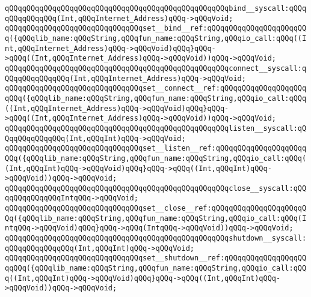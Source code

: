 \newline
\verb|qQQqqQQqqQQqqQQqqQQqqQQqqQQqqQQqqQQqqQQqqQQqqQQqqQQqbind__syscall:qQQqqQQqqQQqqQQq(Int,qQQqInternet_Address)qQQq->qQQqVoid;|\newline
\verb|qQQqqQQqqQQqqQQqqQQqqQQqqQQqqQQqset__bind__ref:qQQqqQQqqQQqqQQqqQQqqQQq({qQQqlib_name:qQQqString,qQQqfun_name:qQQqString,qQQqio_call:qQQq((Int,qQQqInternet_Address)qQQq->qQQqVoid)qQQq}qQQq->qQQq((Int,qQQqInternet_Address)qQQq->qQQqVoid))qQQq->qQQqVoid;|\newline
\newline
\verb|qQQqqQQqqQQqqQQqqQQqqQQqqQQqqQQqqQQqqQQqqQQqqQQqqQQqconnect__syscall:qQQqqQQqqQQqqQQq(Int,qQQqInternet_Address)qQQq->qQQqVoid;|\newline
\verb|qQQqqQQqqQQqqQQqqQQqqQQqqQQqqQQqset__connect__ref:qQQqqQQqqQQqqQQqqQQqqQQq({qQQqlib_name:qQQqString,qQQqfun_name:qQQqString,qQQqio_call:qQQq((Int,qQQqInternet_Address)qQQq->qQQqVoid)qQQq}qQQq->qQQq((Int,qQQqInternet_Address)qQQq->qQQqVoid))qQQq->qQQqVoid;|\newline
\newline
\verb|qQQqqQQqqQQqqQQqqQQqqQQqqQQqqQQqqQQqqQQqqQQqqQQqqQQqlisten__syscall:qQQqqQQqqQQqqQQq(Int,qQQqInt)qQQq->qQQqVoid;|\newline
\verb|qQQqqQQqqQQqqQQqqQQqqQQqqQQqqQQqset__listen__ref:qQQqqQQqqQQqqQQqqQQqqQQq({qQQqlib_name:qQQqString,qQQqfun_name:qQQqString,qQQqio_call:qQQq((Int,qQQqInt)qQQq->qQQqVoid)qQQq}qQQq->qQQq((Int,qQQqInt)qQQq->qQQqVoid))qQQq->qQQqVoid;|\newline
\newline
\verb|qQQqqQQqqQQqqQQqqQQqqQQqqQQqqQQqqQQqqQQqqQQqqQQqqQQqclose__syscall:qQQqqQQqqQQqqQQqIntqQQq->qQQqVoid;|\newline
\verb|qQQqqQQqqQQqqQQqqQQqqQQqqQQqqQQqset__close__ref:qQQqqQQqqQQqqQQqqQQqqQQq({qQQqlib_name:qQQqString,qQQqfun_name:qQQqString,qQQqio_call:qQQq(IntqQQq->qQQqVoid)qQQq}qQQq->qQQq(IntqQQq->qQQqVoid))qQQq->qQQqVoid;|\newline
\newline
\verb|qQQqqQQqqQQqqQQqqQQqqQQqqQQqqQQqqQQqqQQqqQQqqQQqqQQqshutdown__syscall:qQQqqQQqqQQqqQQq(Int,qQQqInt)qQQq->qQQqVoid;|\newline
\verb|qQQqqQQqqQQqqQQqqQQqqQQqqQQqqQQqset__shutdown__ref:qQQqqQQqqQQqqQQqqQQqqQQq({qQQqlib_name:qQQqString,qQQqfun_name:qQQqString,qQQqio_call:qQQq((Int,qQQqInt)qQQq->qQQqVoid)qQQq}qQQq->qQQq((Int,qQQqInt)qQQq->qQQqVoid))qQQq->qQQqVoid;|\newline
\newline
